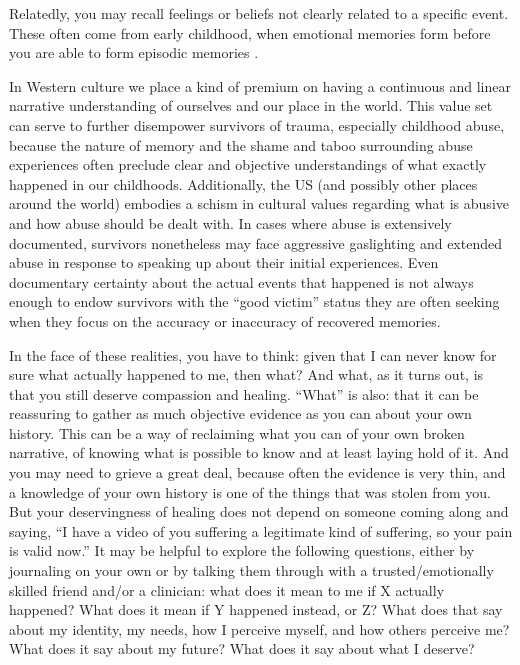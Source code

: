 \documentclass[12pt,letterpaper]{article}
\begin{document}
Relatedly, you may recall feelings or beliefs not clearly related to a specific event. These often come from early childhood, when emotional memories form before you are able to form episodic memories \cite{brownAttachmentDisturbances}.

In Western  culture we place a kind of premium on having a continuous and linear narrative understanding of ourselves and our place in the world. This value set can serve to further disempower survivors of trauma, especially childhood abuse, because the nature of memory and the shame and taboo surrounding abuse experiences often preclude clear and objective understandings of what exactly happened in our childhoods.  Additionally, the US (and possibly other places around the world) embodies a schism in cultural values regarding what is abusive and how abuse should be dealt with. In cases where abuse is extensively documented, survivors nonetheless may face aggressive gaslighting and extended abuse in response to speaking up about their initial experiences. Even documentary certainty about the actual events that happened is not always enough to endow survivors with the “good victim” status they are often seeking when they focus on the accuracy or inaccuracy of recovered memories.

In the face of these realities, you have to think: given that I can never know for sure what actually happened to me, then what?  And what, as it turns out, is that you still deserve compassion and healing.  “What” is also: that it can be reassuring to gather as much objective evidence as you can about your own history. This can be a way of reclaiming what you can of your own broken narrative, of knowing what is possible to know and at least laying hold of it. And you may need to grieve a great deal, because often the evidence is very thin, and a knowledge of your own history is one of the things that was stolen from you. But your deservingness of healing does not depend on someone coming along and saying, “I have a video of you suffering a legitimate kind of suffering, so your pain is valid now.” It may be helpful to explore the following questions, either by journaling on your own or by talking them through with a trusted/emotionally skilled friend and/or a clinician: what does it mean to me if X actually happened? What does it mean if Y happened instead, or Z? What does that say about my identity, my needs, how I perceive myself, and how others perceive me? What does it say about my future? What does it say about what I deserve?
\end{document}
